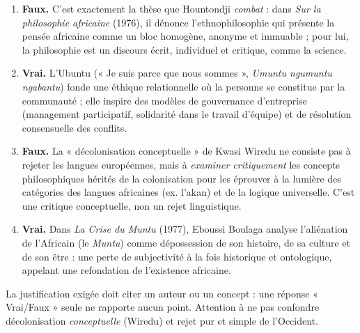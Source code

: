 \documentclass[11pt]{article}
\newcommand{\cle}[1]{{\popxbold\color{popdark}#1}}
\begin{document}
\begin{corrige}
\begin{enumerate}
    \item \textbf{Faux.} C'est exactement la thèse que Hountondji \emph{combat} : dans \emph{Sur la philosophie africaine} (1976), il dénonce l'ethnophilosophie qui présente la pensée africaine comme un bloc homogène, anonyme et immuable ; pour lui, la philosophie est un discours écrit, individuel et critique, comme la science.
    \item \textbf{Vrai.} L'\cle{Ubuntu} (« Je suis parce que nous sommes », \emph{Umuntu ngumuntu ngabantu}) fonde une éthique relationnelle où la personne se constitue par la communauté ; elle inspire des modèles de gouvernance d'entreprise (management participatif, solidarité dans le travail d'équipe) et de résolution consensuelle des conflits.
    \item \textbf{Faux.} La « décolonisation conceptuelle » de Kwasi Wiredu ne consiste pas à rejeter les langues européennes, mais à \emph{examiner critiquement} les concepts philosophiques hérités de la colonisation pour les éprouver à la lumière des catégories des langues africaines (ex. l'akan) et de la logique universelle. C'est une critique conceptuelle, non un rejet linguistique.
    \item \textbf{Vrai.} Dans \emph{La Crise du Muntu} (1977), Eboussi Boulaga analyse l'aliénation de l'Africain (le \emph{Muntu}) comme dépossession de son histoire, de sa culture et de son être : une perte de subjectivité à la fois historique et ontologique, appelant une refondation de l'existence africaine.
\end{enumerate}
\end{corrige}

\begin{attention}
La justification exigée doit citer un auteur ou un concept : une réponse « Vrai/Faux » seule ne rapporte aucun point. Attention à ne pas confondre décolonisation \emph{conceptuelle} (Wiredu) et rejet pur et simple de l'Occident.
\end{attention}
\end{document}
